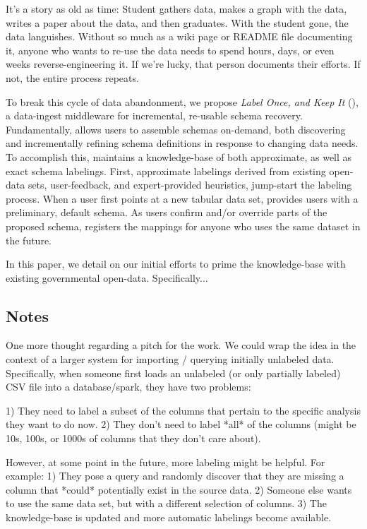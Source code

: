 
It's a story as old as time: Student gathers data, makes a graph with the data, writes a paper about the data, and then graduates.  
With the student gone, the data languishes.
Without so much as a wiki page or README file documenting it, anyone who wants to re-use the data needs to spend hours, days, or even weeks reverse-engineering it.
If we're lucky, that person documents their efforts.  
If not, the entire process repeats.

To break this cycle of data abandonment, we propose \emph{Label Once, and Keep It} (\systemname), a data-ingest middleware for incremental, re-usable schema recovery.
Fundamentally, \systemname allows users to assemble schemas on-demand, both discovering and incrementally refining schema definitions in response to changing data needs.  
To accomplish this, \systemname maintains a knowledge-base of both approximate, as well as exact schema labelings.
First, approximate labelings derived from existing open-data sets, user-feedback, and expert-provided heuristics, jump-start the labeling process.
When a user first points \systemname at a new tabular data set, \systemname provides users with a preliminary, default schema.
As users confirm and/or override parts of the proposed schema, \systemname registers the mappings for anyone who uses the same dataset in the future.

In this paper, we detail on our initial efforts to prime the \systemname knowledge-base with existing governmental open-data.
Specifically...

\subsection{Notes}



One more thought regarding a pitch for the work.  We could wrap the idea in the context of a larger system for importing / querying initially unlabeled data.  Specifically, when someone first loads an unlabeled (or only partially labeled) CSV file into a database/spark, they have two problems:

1) They need to label a subset of the columns that pertain to the specific analysis they want to do now.
2) They don't need to label *all* of the columns (might be 10s, 100s, or 1000s of columns that they don't care about).  

However, at some point in the future, more labeling might be helpful.  For example:
1) They pose a query and randomly discover that they are missing a column that *could* potentially exist in the source data.
2) Someone else wants to use the same data set, but with a different selection of columns.
3) The knowledge-base is updated and more automatic labelings become available.

